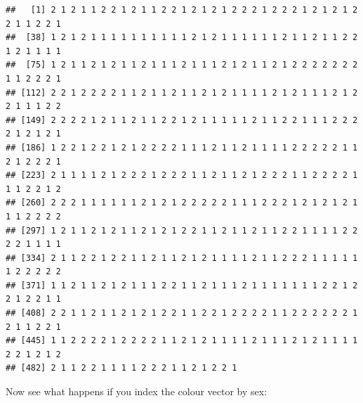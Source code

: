 \documentclass[
]{book}
\newenvironment{Shaded}{\begin{snugshade}}{\end{snugshade}}
\newcommand{\FunctionTok}[1]{\textcolor[rgb]{0.13,0.29,0.53}{\textbf{#1}}}
\newcommand{\NormalTok}[1]{#1}
\newcommand{\SpecialCharTok}[1]{\textcolor[rgb]{0.81,0.36,0.00}{\textbf{#1}}}
\newcommand{\StringTok}[1]{\textcolor[rgb]{0.31,0.60,0.02}{#1}}
\begin{document}
\begin{verbatim}
##   [1] 2 1 2 1 1 2 2 1 2 1 1 2 2 1 2 1 2 1 2 2 2 1 2 2 2 1 2 1 2 1 2 2 1 1 2 2 1
##  [38] 1 2 1 2 1 1 1 1 1 1 1 1 1 1 2 1 2 1 1 1 1 1 1 2 1 1 2 1 1 2 2 1 2 1 1 1 1
##  [75] 1 2 1 1 2 1 2 1 1 2 1 1 1 2 1 1 1 2 1 2 1 1 2 1 2 2 2 2 2 2 2 1 1 2 2 2 1
## [112] 2 2 1 2 2 2 2 1 1 2 1 1 2 1 1 2 1 2 1 1 1 1 2 1 2 1 1 1 2 1 2 2 1 1 1 2 2
## [149] 2 2 2 2 1 2 1 1 2 1 1 2 2 1 2 1 1 1 1 1 2 1 1 2 2 1 1 1 2 2 2 2 1 2 1 2 1
## [186] 1 2 2 1 2 2 1 2 1 2 2 2 2 1 1 1 2 1 1 2 1 1 1 1 2 2 2 2 2 1 1 2 1 2 2 2 1
## [223] 2 1 1 1 1 2 1 2 2 2 1 2 2 2 1 1 2 1 1 2 1 2 2 2 1 1 2 2 2 2 1 1 1 2 2 1 2
## [260] 2 2 2 1 1 1 1 1 1 2 1 2 1 2 2 2 2 2 1 1 1 2 2 2 1 2 1 2 1 2 1 1 1 2 2 2 2
## [297] 1 2 1 1 2 1 2 1 1 2 1 2 1 2 2 1 1 2 1 1 2 1 1 2 2 1 1 1 1 2 2 2 2 1 1 1 1
## [334] 2 1 1 2 2 1 2 2 1 1 2 1 1 2 1 2 1 1 1 1 2 1 1 2 2 2 1 1 1 1 1 1 2 2 2 2 2
## [371] 1 1 2 1 1 2 1 2 1 1 1 2 2 1 1 2 1 1 1 2 1 1 1 1 1 1 1 2 2 1 2 2 1 2 2 1 1
## [408] 2 2 1 1 2 1 1 2 1 2 1 2 2 1 1 2 2 1 2 2 2 2 1 1 2 2 2 2 2 2 1 2 1 1 2 2 1
## [445] 1 1 2 2 2 2 1 2 2 2 2 1 1 2 1 2 1 1 1 1 2 1 1 1 2 1 2 1 1 1 1 2 2 1 2 1 2
## [482] 2 1 1 2 2 1 1 1 1 2 2 2 1 1 2 1 2 2 1
\end{verbatim}

Now see what happens if you index the colour vector by sex:

\begin{Shaded}
\end{Shaded}
\end{document}

